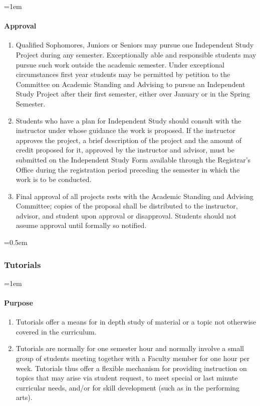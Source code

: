 \documentclass{manual}
\let\oldsubsubsection\subsubsection
\renewcommand\subsubsection{\leftskip=0.5em\oldsubsubsection}
\let\oldparagraph\paragraph
\renewcommand\paragraph{\leftskip=1em\oldparagraph}
\newcommand{\itemLevelA}{\alph*.}
\newcommand{\itemRefA}{\alph*}
\begin{document}
\paragraph{Approval}
\begin{enumerate}[label=\itemLevelA,ref=\itemRefA]
\item Qualified Sophomores, Juniors or Seniors may pursue one Independent Study Project during any semester. Exceptionally able and responsible students may pursue such work outside the academic semester. Under exceptional circumstances first year students may be permitted by petition to the Committee on Academic Standing and Advising to pursue an Independent Study Project after their first semester, either over January or in the Spring Semester.

\item Students who have a plan for Independent Study should consult with the instructor under whose guidance the work is proposed. If the instructor approves the project, a brief description of the project and the amount of credit proposed for it, approved by the instructor and advisor, must be submitted on the Independent Study Form available through the Registrar's Office during the registration period preceding the semester in which the work is to be conducted. 

\item Final approval of all projects rests with the Academic Standing and Advising Committee; copies of the proposal shall be distributed to the instructor, advisor, and student upon approval or disapproval. Students should not assume approval until formally so notified.
\end{enumerate}

\subsubsection{Tutorials}

\paragraph{Purpose}
\begin{enumerate}[label=\itemLevelA,ref=\itemRefA]
\item Tutorials offer a means for in depth study of material or a topic not otherwise covered in the curriculum.  

\item Tutorials are normally for one semester hour and normally involve a small group of students meeting together with a Faculty member for one hour per week.  Tutorials thus offer a flexible mechanism for providing instruction on topics that may arise via student request, to meet special or last minute curricular needs, and/or for skill development (such as in the performing arts).                                                                                                                     
\end{enumerate}
\end{document}
